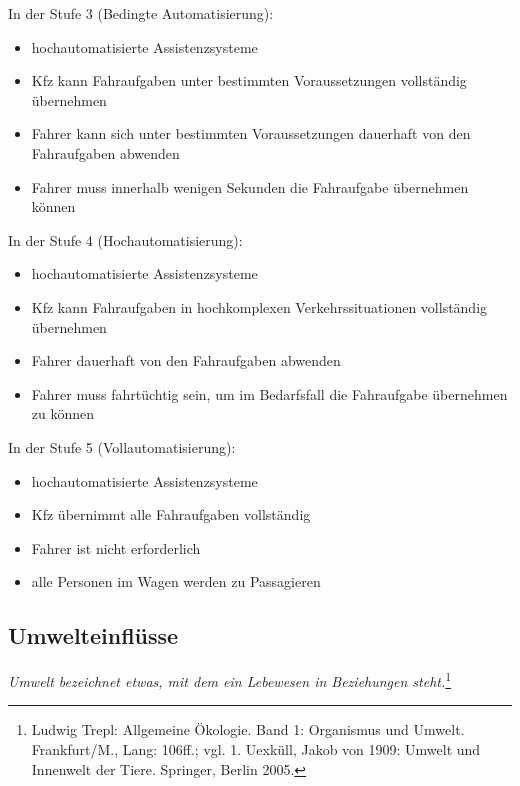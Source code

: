 \vspace{0.5cm}

In der Stufe 3 (Bedingte Automatisierung):
\begin{itemize}
	\item hochautomatisierte Assistenzsysteme
	\item \ac{Kfz} kann Fahraufgaben unter bestimmten Voraussetzungen vollständig übernehmen
	\item Fahrer kann sich unter bestimmten Voraussetzungen dauerhaft von den Fahraufgaben abwenden
	\item Fahrer muss innerhalb wenigen Sekunden die Fahraufgabe übernehmen können
\end{itemize}

\vspace{0.5cm}

In der Stufe 4 (Hochautomatisierung):
\begin{itemize}
	\item hochautomatisierte Assistenzsysteme
	\item \ac{Kfz} kann Fahraufgaben in hochkomplexen Verkehrssituationen vollständig übernehmen
	\item Fahrer dauerhaft von den Fahraufgaben abwenden
	\item Fahrer muss fahrtüchtig sein, um im Bedarfsfall die Fahraufgabe übernehmen zu können
\end{itemize}

\vspace{0.5cm}

In der Stufe 5 (Vollautomatisierung):
\begin{itemize}
	\item hochautomatisierte Assistenzsysteme
	\item \ac{Kfz} übernimmt alle Fahraufgaben vollständig
	\item Fahrer ist nicht erforderlich
	\item alle Personen im Wagen werden zu Passagieren
\end{itemize}

\subsection{Umwelteinflüsse}

\textit{Umwelt bezeichnet etwas, mit dem ein Lebewesen in Beziehungen steht.}\footnote{Ludwig Trepl: Allgemeine Ökologie. Band 1: Organismus und Umwelt. Frankfurt/M., Lang: 106ff.; vgl. 1. Uexküll, Jakob von 1909: Umwelt und Innenwelt der Tiere. Springer, Berlin 2005.}

